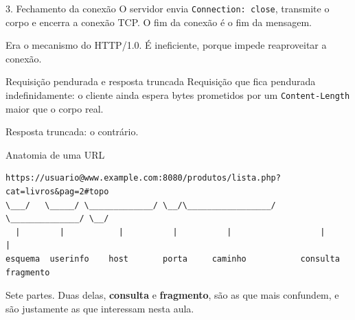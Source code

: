 \documentclass{beamer}
\begin{document}
\begin{frame}{3. Fechamento da conexão}
  O servidor envia \texttt{Connection: close}, transmite o corpo e encerra a
  conexão TCP. O fim da conexão é o fim da mensagem.

  \vspace{0.4cm}
  Era o mecanismo do HTTP/1.0. É ineficiente, porque impede reaproveitar a
  conexão.

  \vspace{0.6cm}
  \begin{alertblock}{Requisição pendurada e resposta truncada}
    Requisição que fica pendurada indefinidamente: o cliente ainda espera bytes
    prometidos por um \texttt{Content-Length} maior que o corpo real.

    \vspace{0.2cm}
    Resposta truncada: o contrário.
  \end{alertblock}
\end{frame}


\begin{frame}[fragile]{Anatomia de uma URL}
  \begin{center}
    \begin{verbatim}
https://usuario@www.example.com:8080/produtos/lista.php?cat=livros&pag=2#topo
\___/   \_____/ \_____________/ \__/\_________________/ \______________/ \__/
  |        |           |          |          |                  |          |
esquema  userinfo    host       porta     caminho           consulta   fragmento
    \end{verbatim}
  \end{center}

  \vspace{0.5cm}
  Sete partes. Duas delas, \textbf{consulta} e \textbf{fragmento}, são as que
  mais confundem, e são justamente as que interessam nesta aula.
\end{frame}
\end{document}
